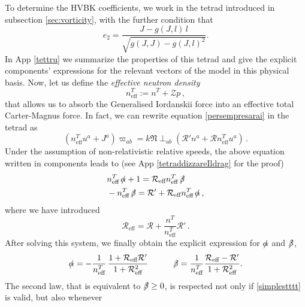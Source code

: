 \documentclass[preprints,article,accept,moreauthors,pdftex]{mdpi}
\newcommand{\spc}{\quad \quad \quad}
\begin{document}
To determine the HVBK coefficients, we work in the tetrad  introduced in subsection \ref{sec:vorticity}, with the further condition that 
\begin{equation}
e_2 = \dfrac{J -g(J,l) \, l}{\sqrt{g(J,J)-g(J,l)^2}}. 
\end{equation}
In App \ref{tettru} we summarize the properties of this tetrad and give the explicit components' expressions for the relevant vectors of the model in this physical basis. Now, let us define the \textit{effective neutron density} 
\begin{equation}
\label{neFFF}
n^T_{\text{eff}}:= n^T+\mathcal{Z}p \, ,
\end{equation}
that allows us to absorb the Generalised Iordanskii force into an effective total Carter-Magnus force. In fact, we can rewrite equation \eqref{persempresarai} in the tetrad as 
\begin{equation}
\label{pufficosa}
(n^T_{\text{eff}} u^a +J^a)\varpi_{ab} = 
k \mathfrak{N} {\perp}_{ab}(\mathcal{R}' n^a + \mathcal{R} n^T_{\text{eff}} u^a) \, .
\end{equation}
Under the assumption of non-relativistic relative speeds, the above equation written in components leads to (see App \ref{tetraddizzareIldrag} for the proof)
\begin{equation}\label{bellatutto}
\begin{split}
&  n^T_{\text{eff}} \, \slashed{\alpha} +1= \mathcal{R}_{\text{eff}} n^T_{\text{eff}} \, \slashed{\beta}  \\
&  -n^T_{\text{eff}} \, \slashed{\beta}= \mathcal{R}' + \mathcal{R}_{\text{eff}} n^T_{\text{eff}}
\, \slashed{\alpha} \,  ,
\end{split}
\end{equation}
where we have introduced 
\begin{equation}
\label{Reff}
\mathcal{R}_{\text{eff}} = \mathcal{R} + \dfrac{n^T}{n^T_{\text{eff}}} \mathcal{R}' \, .
\end{equation}
After solving this system, we finally obtain the explicit expression for $\slashed{\alpha}$ and $\slashed{\beta}$,
\begin{equation}
\label{alpha_beta}
 \slashed{\alpha} =-\dfrac{1}{n^T_{\text{eff}}} \, \dfrac{1  + \mathcal{R}_{\text{eff}} \mathcal{R}'}{1+ \mathcal{R}_{\text{eff}}^2} 
\spc  \slashed{\beta} = \dfrac{1}{n^T_{\text{eff}}} \dfrac{ \mathcal{R}_{\text{eff}} - \mathcal{R}'}{1+ \mathcal{R}_{\text{eff}}^2}. 
\end{equation}
The second law, that is  equivalent to $\slashed{\beta} \geq 0$, is respected not only if \eqref{simplestttt} is valid, but also whenever
\end{document}
